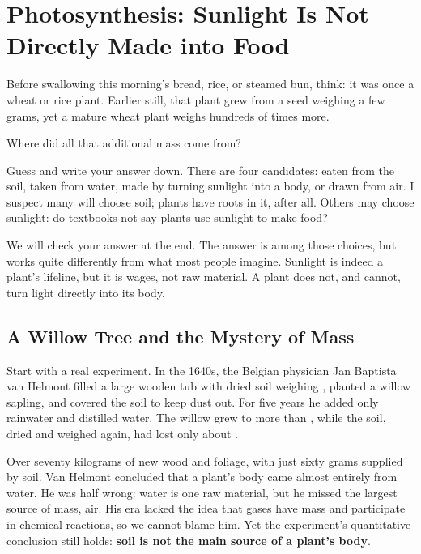 \chapter{Photosynthesis: Sunlight Is Not Directly Made into Food}

\begin{kaichang}
Before swallowing this morning's bread, rice, or steamed bun, think: it was once a wheat or rice plant. Earlier still, that plant grew from a seed weighing a few grams, yet a mature wheat plant weighs hundreds of times more.

Where did all that additional mass come from?

Guess and write your answer down. There are four candidates: eaten from the soil, taken from water, made by turning sunlight into a body, or drawn from air. I suspect many will choose soil; plants have roots in it, after all. Others may choose sunlight: do textbooks not say plants use sunlight to make food?

We will check your answer at the end. The answer is among those choices, but works quite differently from what most people imagine. Sunlight is indeed a plant's lifeline, but it is wages, not raw material. A plant does not, and cannot, turn light directly into its body.
\end{kaichang}

\section{A Willow Tree and the Mystery of Mass}

Start with a real experiment. In the 1640s, the Belgian physician Jan Baptista van Helmont filled a large wooden tub with dried soil weighing , planted a  willow sapling, and covered the soil to keep dust out. For five years he added only rainwater and distilled water. The willow grew to more than , while the soil, dried and weighed again, had lost only about .

Over seventy kilograms of new wood and foliage, with just sixty grams supplied by soil. Van Helmont concluded that a plant's body came almost entirely from water. He was half wrong: water is one raw material, but he missed the largest source of mass, air. His era lacked the idea that gases have mass and participate in chemical reactions, so we cannot blame him. Yet the experiment's quantitative conclusion still holds: \textbf{soil is not the main source of a plant's body}.


